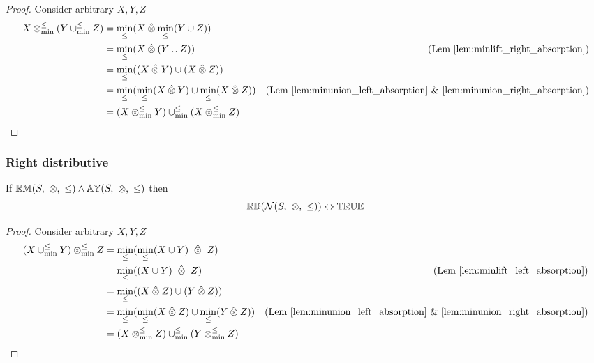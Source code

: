 \documentclass[../Summary.tex]{subfiles}
\begin{document}
\begin{proof}

\vspace{0.5em}
Consider arbitrary $X,Y,Z$
\begin{align*}
X \mathbin{\otimes_{\min}^{\leq}} (Y \mathbin{\cup_{\min}^{\leq}} Z) 	& = \min_\leq(X \mathbin{\hat{\otimes}} \min_\leq(Y \cup Z)) \\
							& = \min_\leq(X \mathbin{\hat{\otimes}} (Y \cup Z)) & \text{(Lem~\ref{lem:minlift_right_absorption})} \\
							& = \min_\leq((X \mathbin{\hat{\otimes}} Y) \cup (X \mathbin{\hat{\otimes}} Z)) \\
							& = \min_\leq(\min_\leq(X \mathbin{\hat{\otimes}} Y) \cup \min_\leq(X \mathbin{\hat{\otimes}} Z)) & \text{(Lem \ref{lem:minunion_left_absorption} \& \ref{lem:minunion_right_absorption})} \\
							& = (X \mathbin{\otimes_{\min}^{\leq}} Y) \mathbin{\cup_{\min}^{\leq}} (X \mathbin{\otimes_{\min}^{\leq}} Z)
\end{align*}
\end{proof}




\subsubsection{Right distributive}

\begin{theorem} \label{thm:N_rd}
If ${\mathbb{RM}}(S,\ \otimes,\ \leq) \wedge {\mathbb{AY}}(S,\ \otimes, \ \leq)$ then
\begin{equation*}
\propname{RD}(\mathcal{N}(S,\ \otimes,\ \leq))  \Leftrightarrow \propname{TRUE}
\end{equation*}
\end{theorem}
 

\begin{proof}

\vspace{0.5em}
Consider arbitrary $X,Y,Z$
\begin{align*}
(X \minunion Y) \minlift Z 	& = \min_\leq(\min_\leq(X \cup Y) \ \lift \ Z) \\
							& = \min_\leq((X \cup Y) \ \lift \ Z) & \text{(Lem \ref{lem:minlift_left_absorption})}\\
							& = \min_\leq((X \lift Z) \cup (Y \lift Z)) \\
							& = \min_\leq(\min_\leq(X \lift Z) \cup \min_\leq(Y \lift Z)) & \text{(Lem \ref{lem:minunion_left_absorption} \& \ref{lem:minunion_right_absorption})} \\
							& = (X \minlift Z) \minunion (Y \minlift Z)
\end{align*}
\end{proof}
\end{document}
